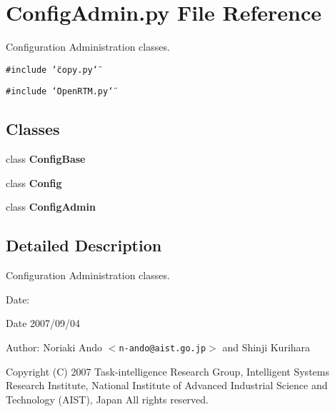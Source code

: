 \section{Config\-Admin.py File Reference}
\label{ConfigAdmin_8py}
Configuration Administration classes. 

{\tt \#include \char`\"{}copy.py\char`\"{}}\par
{\tt \#include \char`\"{}Open\-RTM.py\char`\"{}}\par
\subsection*{Classes}
\begin{CompactItemize}
\item 
class {\bf Config\-Base}
\item 
class {\bf Config}
\item 
class {\bf Config\-Admin}
\end{CompactItemize}


\subsection{Detailed Description}
Configuration Administration classes. 

\begin{Desc}
\item[Date:]\begin{Desc}
\item[Date]2007/09/04\end{Desc}
\end{Desc}
\begin{Desc}
\item[Author:]Noriaki Ando $<${\tt n-ando@aist.go.jp}$>$ and Shinji Kurihara\end{Desc}
Copyright (C) 2007 Task-intelligence Research Group, Intelligent Systems Research Institute, National Institute of Advanced Industrial Science and Technology (AIST), Japan All rights reserved.